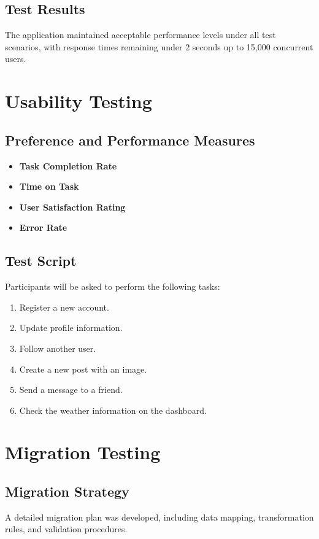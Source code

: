 \documentclass[12pt,a4paper]{report}
\begin{document}
\section{Test Results}
The application maintained acceptable performance levels under all test scenarios, with response times remaining under 2 seconds up to 15,000 concurrent users.

\chapter{Usability Testing}
\section{Preference and Performance Measures}
\begin{itemize}
    \item \textbf{Task Completion Rate}
    \item \textbf{Time on Task}
    \item \textbf{User Satisfaction Rating}
    \item \textbf{Error Rate}
\end{itemize}

\section{Test Script}
Participants will be asked to perform the following tasks:
\begin{enumerate}
    \item Register a new account.
    \item Update profile information.
    \item Follow another user.
    \item Create a new post with an image.
    \item Send a message to a friend.
    \item Check the weather information on the dashboard.
\end{enumerate}

\chapter{Migration Testing}
\section{Migration Strategy}
A detailed migration plan was developed, including data mapping, transformation rules, and validation procedures.
\end{document}
